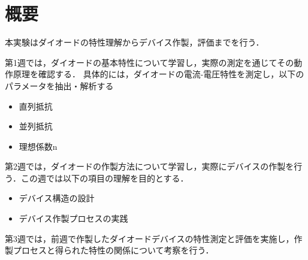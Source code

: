 \section{概要}

本実験はダイオードの特性理解からデバイス作製，評価までを行う．

第1週では，ダイオードの基本特性について学習し，実際の測定を通じてその動作原理を確認する．
具体的には，ダイオードの電流-電圧特性を測定し，以下のパラメータを抽出・解析する
\begin{itemize}
    \item 直列抵抗
    \item 並列抵抗  
    \item 理想係数n
\end{itemize}

第2週では，ダイオードの作製方法について学習し，実際にデバイスの作製を行う．この週では以下の項目の理解を目的とする．
\begin{itemize}
    \item デバイス構造の設計
    \item デバイス作製プロセスの実践
\end{itemize}

第3週では，前週で作製したダイオードデバイスの特性測定と評価を実施し，作製プロセスと得られた特性の関係について考察を行う．
